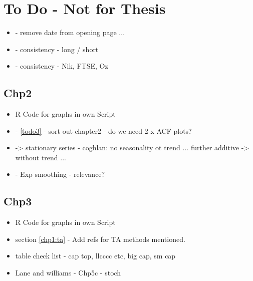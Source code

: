 
\chapter{To Do - Not for Thesis} %

\label{Chapter7} %




\begin{itemize}
\item - remove date from opening page ...
\item - consistency - long / short
\item - consistency - Nik, FTSE, Oz

\end{itemize}

\section{Chp2}
\begin{itemize}
\item R Code for graphs in own Script
\item - \ref{todo3} - sort out chapter2 - do we need 2 x ACF plots?
\item -> stationary series - coghlan: no seasonality ot trend ...  further additive -> without trend ...
\item - Exp smoothing - relevance?
\end{itemize}

\section{Chp3}
\begin{itemize}
\item R Code for graphs in own Script
\item section \ref{chp1:ta} - Add refs for TA methods mentioned.
\item table check list - cap top, llcccc etc, big cap, sm cap
\item Lane \cite{lane1986using} and williams \cite{williams2011long} \cite{williams1989definitive} - Chp5c - stoch
\end{itemize}

